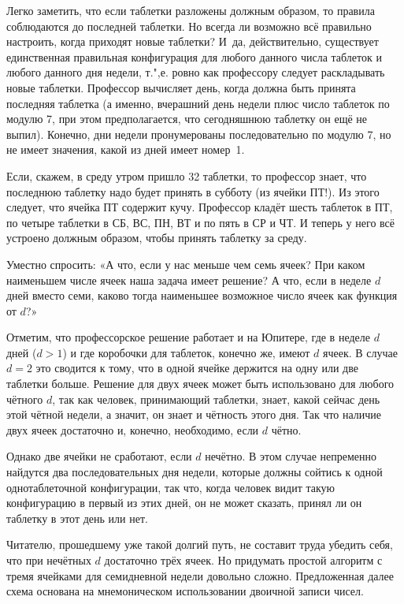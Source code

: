 \documentclass[twoside]{book}
\begin{document}
Легко заметить, что если таблетки разложены должным образом, то правила соблюдаются до последней таблетки.
Но всегда ли возможно всё правильно настроить, когда приходят новые таблетки?
И~да, действительно, существует единственная правильная конфигурация для любого данного числа таблеток и любого данного дня недели, т.",е. ровно как профессору следует раскладывать новые таблетки.
Профессор вычисляет день, когда должна быть принята последняя таблетка (а именно, вчерашний день недели плюс число таблеток по модулю 7, при этом
предполагается, что сегодняшнюю таблетку он ещё не выпил).
Конечно, дни недели пронумерованы последовательно  по модулю 7, но не имеет значения, какой из дней имеет номер~1.

Если, скажем, в среду утром пришло 32 таблетки, то профессор знает, что последнюю таблетку надо будет принять в субботу (из ячейки ПТ!). Из этого следует, что ячейка ПТ содержит кучу.
Профессор кладёт шесть таблеток в ПТ, по четыре таблетки в СБ, ВС, ПН, ВТ и по пять в СР и ЧТ.
И теперь у него всё устроено должным образом, чтобы принять таблетку за среду.
\heart

Уместно спросить:
«А что, если у нас меньше чем семь ячеек?
При каком наименьшем числе ячеек наша задача имеет решение?
А что, если в неделе $d$ дней вместо семи,
каково тогда наименьшее возможное число ячеек как функция от $d$?»

Отметим, что профессорское решение работает и на Юпитере, где в неделе $d$ дней ($d>1$) и где коробочки для таблеток, конечно же, имеют $d$ ячеек.
В случае $d=2$ это сводится к тому, что в одной ячейке держится на одну или две таблетки больше.
Решение для двух ячеек может быть использовано для любого чётного $d$, так как человек, принимающий таблетки, знает, какой сейчас день этой чётной недели, а значит, он знает и чётность этого дня.
Так что наличие двух ячеек достаточно и, конечно, необходимо, если $d$ чётно.

Однако две ячейки не сработают, если $d$ нечётно.
В этом случае непременно найдутся два последовательных дня недели, которые должны сойтись к одной однотаблеточной конфигурации, так что, когда человек видит такую конфигурацию в первый из этих дней, он не может сказать, принял ли он таблетку в этот день или нет.

Читателю, прошедшему уже такой долгий путь, не составит труда убедить себя, что при нечётных $d$ достаточно трёх ячеек.
Но придумать простой алгоритм с тремя ячейками для семидневной недели довольно сложно.
Предложенная далее схема основана на мнемоническом использовании двоичной записи чисел.
\end{document}
